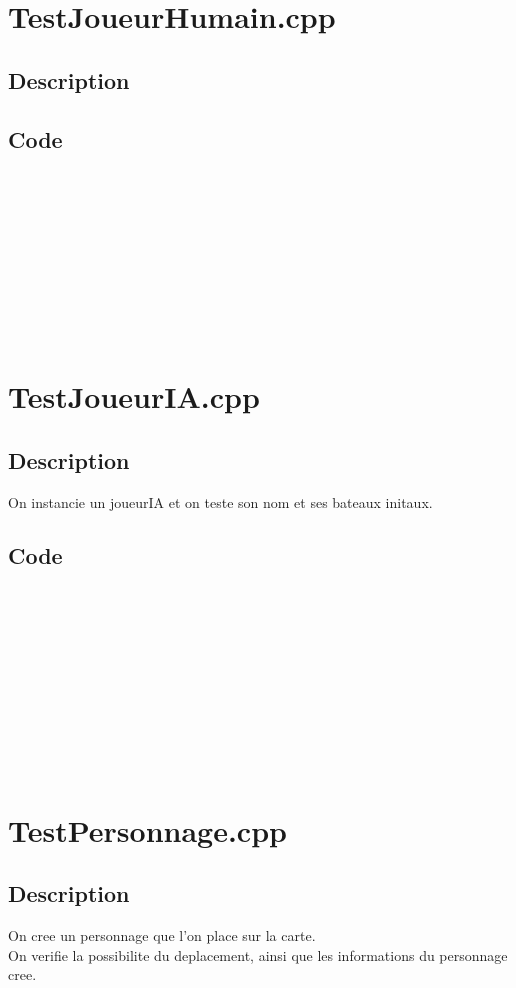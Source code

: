     \section{TestJoueurHumain.cpp}
        \subsection{Description}
        \subsection{Code}
\begin{lstlisting}
	










	\end{lstlisting}
    \section{TestJoueurIA.cpp}
        \subsection{Description}
        On instancie un joueurIA et on teste son nom et ses bateaux initaux.
        \subsection{Code}
\begin{lstlisting}
	











	\end{lstlisting}
    \section{TestPersonnage.cpp}
        \subsection{Description}
            On cree un personnage que l'on place sur la carte.\\
            On verifie la possibilite du deplacement, ainsi que les informations du personnage cree.
